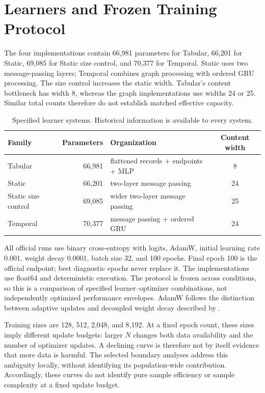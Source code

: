 \documentclass[11pt]{article}
\begin{document}
\section{Learners and Frozen Training Protocol}

The four implementations contain 66,981 parameters for Tabular, 66,201 for Static, 69,085 for Static size control, and 70,377 for Temporal. Static uses two message-passing layers; Temporal combines graph processing with ordered GRU processing. The size control increases the static width. Tabular's content bottleneck has width 8, whereas the graph implementations use widths 24 or 25. Similar total counts therefore do not establish matched effective capacity.

\begin{table}[t]
\centering
\caption{Specified learner systems. Historical information is available to every system.}
\label{tab:learners}
\small
\begin{tabular}{lrlc}
\toprule
Family & Parameters & Organization & Content width \\
\midrule
Tabular & 66,981 & flattened records + endpoints + MLP & 8 \\
Static & 66,201 & two-layer message passing & 24 \\
Static size control & 69,085 & wider two-layer message passing & 25 \\
Temporal & 70,377 & message passing + ordered GRU & 24 \\
\bottomrule
\end{tabular}
\end{table}

All official runs use binary cross-entropy with logits, AdamW, initial learning rate 0.001, weight decay 0.0001, batch size 32, and 100 epochs. Final epoch 100 is the official endpoint; best diagnostic epochs never replace it. The implementations use float64 and deterministic execution. The protocol is frozen across conditions, so this is a comparison of specified learner--optimizer combinations, not independently optimized performance envelopes. AdamW follows the distinction between adaptive updates and decoupled weight decay described by \citet{adamw}.

Training sizes are 128, 512, 2,048, and 8,192. At a fixed epoch count, these sizes imply different update budgets: larger $N$ changes both data availability and the number of optimizer updates. A declining curve is therefore not by itself evidence that more data is harmful. The selected boundary analyses address this ambiguity locally, without identifying its population-wide contribution. Accordingly, these curves do not identify pure sample efficiency or sample complexity at a fixed update budget.
\end{document}
